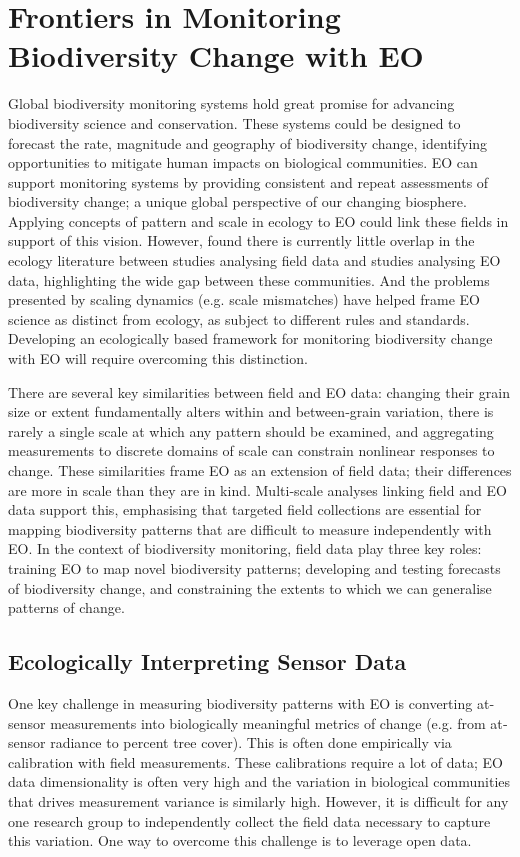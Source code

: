 \section{Frontiers in Monitoring Biodiversity Change with EO}

Global biodiversity monitoring systems hold great promise for advancing biodiversity science and conservation. These systems could be designed to forecast the rate, magnitude and geography of biodiversity change, identifying opportunities to mitigate human impacts on biological communities. EO can support monitoring systems by providing consistent and repeat assessments of biodiversity change; a unique global perspective of our changing biosphere. Applying concepts of pattern and scale in ecology to EO could link these fields in support of this vision. However, \cite{estes2018spatial} found there is currently little overlap in the ecology literature between studies analysing field data and studies analysing EO data, highlighting the wide gap between these communities. And the problems presented by scaling dynamics (e.g. scale mismatches) have helped frame EO science as distinct from ecology, as subject to different rules and standards. Developing an ecologically based framework for monitoring biodiversity change with EO will require overcoming this distinction.

There are several key similarities between field and EO data: changing their grain size or extent fundamentally alters within and between‐grain variation, there is rarely a single scale at which any pattern should be examined, and aggregating measurements to discrete domains of scale can constrain nonlinear responses to change. These similarities frame EO as an extension of field data; their differences are more in scale than they are in kind. Multi‐scale analyses linking field and EO data support this, emphasising that targeted field collections are essential for mapping biodiversity patterns that are difficult to measure independently with EO. In the context of biodiversity monitoring, field data play three key roles: training EO to map novel biodiversity patterns; developing and testing forecasts of biodiversity change, and constraining the extents to which we can generalise patterns of change.

\subsection{Ecologically Interpreting Sensor Data}

One key challenge in measuring biodiversity patterns with EO is converting at‐sensor measurements into biologically meaningful metrics of change (e.g. from at‐sensor radiance to percent tree cover). This is often done empirically via calibration with field measurements. These calibrations require a lot of data; EO data dimensionality is often very high and the variation in biological communities that drives measurement variance is similarly high. However, it is difficult for any one research group to independently collect the field data necessary to capture this variation. One way to overcome this challenge is to leverage open data. 


